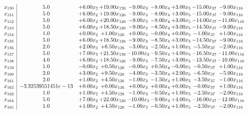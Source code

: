 \documentclass[8pt]{article}
\begin{document}
\[\begin{array}{c| c c@{\hskip 2pt} c@{\hskip 2pt} c@{\hskip 2pt} c@{\hskip 2pt} c@{\hskip 2pt} c@{\hskip 2pt} c@{\hskip 2pt} }
 x_{150}   &  5.0 & +  6.00 x_{2} & + 19.00 x_{126} & -9.00 x_{3} & -8.00 x_{4} & +  3.00 x_{5} & -15.00 x_{37} & -9.00 x_{116}\\
 x_{151}   &  5.0 & +  6.00 x_{2} & + 19.00 x_{126} & -9.00 x_{3} & -8.00 x_{4} & +  3.00 x_{5} & -15.00 x_{37} & -9.00 x_{116}\\
 x_{152}   &  5.0 & +  6.00 x_{2} & + 20.00 x_{126} & -9.00 x_{3} & -8.00 x_{4} & +  3.00 x_{5} & -14.00 x_{37} & -11.00 x_{116}\\
 x_{153}   &  5.0 & +  6.00 x_{2} & + 18.50 x_{126} & -9.00 x_{3} & -8.50 x_{4} & +  3.00 x_{5} & -14.50 x_{37} & -9.00 x_{116}\\
 x_{154}   &  1.0 & +  0.00 x_{2} & +  1.00 x_{126} & +  0.00 x_{3} & -0.00 x_{4} & +  0.00 x_{5} & -1.00 x_{37} & +  1.00 x_{116}\\
 x_{155}   &  5.0 & +  6.00 x_{2} & + 18.50 x_{126} & -9.00 x_{3} & -8.50 x_{4} & +  3.00 x_{5} & -14.50 x_{37} & -9.00 x_{116}\\
 x_{156}   &  2.0 & +  2.00 x_{2} & +  6.50 x_{126} & -3.00 x_{3} & -2.50 x_{4} & +  1.00 x_{5} & -5.50 x_{37} & -2.00 x_{116}\\
 x_{157}   &  5.0 & +  7.00 x_{2} & + 21.50 x_{126} & -10.00 x_{3} & -9.50 x_{4} & +  4.00 x_{5} & -16.50 x_{37} & -11.00 x_{116}\\
 x_{158}   &  4.0 & +  6.00 x_{2} & + 18.50 x_{126} & -9.00 x_{3} & -7.50 x_{4} & +  3.00 x_{5} & -13.50 x_{37} & -10.00 x_{116}\\
 x_{159}   &  1.0 & -0.00 x_{2} & +  0.50 x_{126} & -0.00 x_{3} & +  0.50 x_{4} & -0.00 x_{5} & -0.50 x_{37} & +  1.00 x_{116}\\
 x_{160}   &  2.0 & +  3.00 x_{2} & +  9.50 x_{126} & -4.00 x_{3} & -3.50 x_{4} & +  2.00 x_{5} & -6.50 x_{37} & -5.00 x_{116}\\
 x_{161}   &  2.0 & +  1.00 x_{2} & +  4.50 x_{126} & -1.00 x_{3} & -1.50 x_{4} & +  1.00 x_{5} & -3.50 x_{37} & -1.00 x_{116}\\
 x_{162}   &  -3.32539551451e-13 & +  0.00 x_{2} & +  0.00 x_{126} & +  0.00 x_{3} & +  0.00 x_{4} & +  0.00 x_{5} & -0.00 x_{37} & +  1.00 x_{116}\\
 x_{163}   &  1.0 & +  1.00 x_{2} & +  4.50 x_{126} & -1.00 x_{3} & -0.50 x_{4} & +  1.00 x_{5} & -2.50 x_{37} & -2.00 x_{116}\\
 x_{164}   &  5.0 & +  7.00 x_{2} & + 22.00 x_{126} & -10.00 x_{3} & -9.00 x_{4} & +  4.00 x_{5} & -16.00 x_{37} & -12.00 x_{116}\\
 x_{165}   &  1.0 & +  1.00 x_{2} & +  4.50 x_{126} & -1.00 x_{3} & -0.50 x_{4} & +  1.00 x_{5} & -2.50 x_{37} & -2.00 x_{116}\\

\end{array}\]
\end{document}

